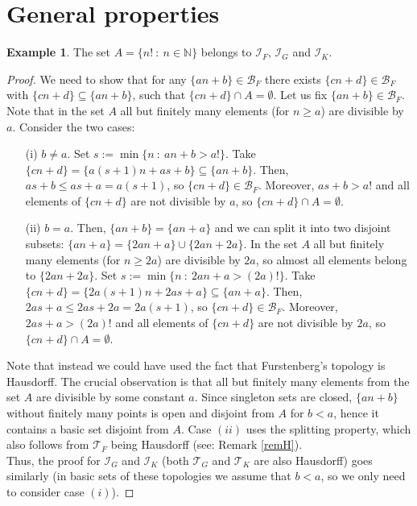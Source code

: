 \documentclass{amsart}
\theoremstyle{definition}
\theoremstyle{definition}
\newtheorem{ex}{Example}
\newcommand{\N}{{\mathbb N}}
\newcommand{\I}{\mathcal I}
\newcommand{\T}{\mathcal{T}}
\newcommand{\B}{\mathcal{B}}
\begin{document}
\section{General properties}



\begin{ex} 
The set $A = \{n! \ :\ n\in\N\}$ belongs to $\I_F$, $\I_G$ and $\I_K$.
\end{ex}

\begin{proof}
We need to show that for any $\{an+b\} \in \B_F$ there exists $\{cn+d\} \in \B_F$ with $\{cn+d\} \subseteq \{an+b\}$, such that $\{cn+d\}\cap A = \emptyset$. Let us fix $\{an+b\} \in \B_F$. Note that in the set $A$ all but finitely many elements (for $n\geq a$) are divisible by $a$. Consider the two cases:
\begin{itemize}
 \item[(i)] $b\neq a$. Set $s:= \min \{n\ :\ an+b>a!\}$. Take $\{cn+d\} = \{a(s+1)n+as+b\} \subseteq \{an+b\}$. Then, $as+b\leq as+a = a(s+1)$, so $\{cn+d\}\in \B_F$. Moreover, $as+b>a!$ and all elements of $\{cn+d\}$ are not divisible by $a$, so $\{cn+d\}\cap A = \emptyset$.
 \item[(ii)] $b=a$. Then, $\{an+b\} = \{an+a\}$ and we can split it into two disjoint subsets: $\{an+a\} = \{2an+a\}\cup \{2an+2a\}$. In the set $A$ all but finitely many elements (for $n\geq 2a$) are divisible by $2a$, so almost all elements belong to $\{2an+2a\}$. Set $s:= \min \{n\ :\ 2an+a>(2a)!\}$. Take $\{cn+d\} = \{2a(s+1)n+2as+a\} \subseteq \{an+a\}$. Then, $2as+a\leq 2as+2a = 2a(s+1)$, so $\{cn+d\}\in \B_F$. Moreover, $2as+a>(2a)!$ and all elements of $\{cn+d\}$ are not divisible by $2a$, so $\{cn+d\}\cap A = \emptyset$.
\end{itemize}
Note that instead we could have used the fact that Furstenberg's topology is Hausdorff. The crucial observation is that all but finitely many elements from the set $A$ are divisible by some constant $a$. Since singleton sets are closed, $\{an+b\}$ without finitely many points is open and disjoint from $A$ for $b<a$, hence it contains a basic set disjoint from $A$. Case $(ii)$ uses the splitting property, which also follows from $\T_F$ being Hausdorff (see: Remark \ref{remH}).\\
Thus, the proof for $\I_G$ and $\I_K$ (both $\T_G$ and $\T_K$ are also Hausdorff) goes similarly (in basic sets of these topologies we assume that $b<a$, so we only need to consider case $(i)$).
\end{proof}
\end{document}
